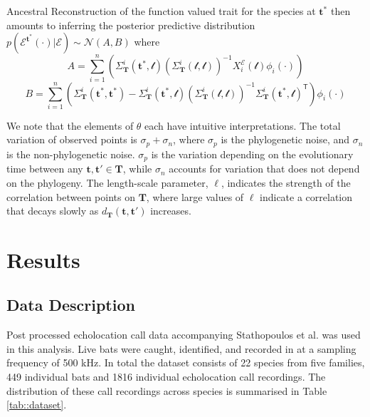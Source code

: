 \documentclass{ws-rv9x6}
\begin{document}
Ancestral Reconstruction of the function valued trait for the species at \(\mathbf{t}^*\) then amounts to inferring the posterior predictive distribution \(p(\mathcal{E}^{\mathbf{t}^*} (\cdot) | \mathcal{E}) \sim \mathcal{N}(A, B)\) where 
\begin{equation}
A = \sum_{i=1}^{n} \left( \Sigma_{\mathbf{T}}^i(\mathbf{t}^*, \mathcal{t}) \left( \Sigma_{\mathbf{T}}^i(\mathcal{t}, \mathcal{t})
\right)^{-1} X_i^{\mathcal{E}} (\mathcal{t}) \phi_i(\cdot) \right)
\label{eqn:postmean}
\end{equation}
\begin{equation}
B = \sum_{i=1}^{n}\left( \Sigma_{\mathbf{T}}^i(\mathbf{t}^*, \mathbf{t}^*) -  \Sigma_{\mathbf{T}}^i(\mathbf{t}^*, \mathcal{t}) \left( \Sigma_{\mathbf{T}}^i(\mathcal{t}, \mathcal{t})
\right)^{-1} \Sigma_{\mathbf{T}}^i(\mathbf{t}^*, \mathcal{t})^{\mathsf{T}} \right) \phi_i (\cdot)
\label{eqn:postvar}
\end{equation}

We note that the elements of \(\theta\) each have intuitive interpretations. The total variation of observed points is \(\sigma_p + \sigma_n\), where \(\sigma_p\) is the phylogenetic noise, and \(\sigma_n\) is the non-phylogenetic noise. \(\sigma_p\) is the variation depending on the evolutionary time between any \(\mathbf{t}, \mathbf{t}' \in \mathbf{T}\), while \(\sigma_n\) accounts for variation that does not depend on the phylogeny. The length-scale parameter, \(\ell\), indicates the strength of the correlation between points on \(\mathbf{T}\), where large values of \(\ell\) indicate a correlation that decays slowly as \(d_{\mathbf{T}}(\mathbf{t}, \mathbf{t}')\) increases. 

\section{Results}
\label{sec:results}
\subsection{Data Description}

Post processed echolocation call data accompanying Stathopoulos et al. \cite{stathopoulos2017bat} was used in this analysis. Live bats were caught, identified, and recorded in at a sampling frequency of 500 kHz. 
In total the dataset consists of 22 species from five families, 449 individual bats and 1816 individual echolocation call recordings. The distribution of these call recordings across species is summarised in Table \ref{tab::dataset}.
\end{document}
